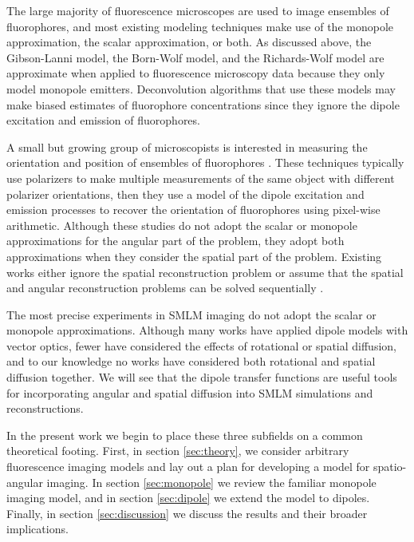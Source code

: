 \documentclass[]{osa-article}
\begin{document}
The large majority of fluorescence microscopes are used to image ensembles of
fluorophores, and most existing modeling techniques make use of the monopole
approximation, the scalar approximation, or both. As discussed above, the
Gibson-Lanni model, the Born-Wolf model, and the Richards-Wolf model are
approximate when applied to fluorescence microscopy data because they only model
monopole emitters. Deconvolution algorithms that use these models may make
biased estimates of fluorophore concentrations since they ignore the dipole
excitation and emission of fluorophores. 

A small but growing group of microscopists is interested in measuring the
orientation and position of ensembles of fluorophores \cite{vrabioiu2006,
  mattheyses2010, mehta2016, mcquilken2017, zhanghao2017}. These techniques
typically use polarizers to make multiple measurements of the same object with
different polarizer orientations, then they use a model of the dipole excitation
and emission processes \cite{fourkas2001} to recover the orientation of
fluorophores using pixel-wise arithmetic. Although these studies do not adopt
the scalar or monopole approximations for the angular part of the problem, they
adopt both approximations when they consider the spatial part of the problem.
Existing works either ignore the spatial reconstruction problem
\cite{vrabioiu2006, mattheyses2010, mehta2016, mcquilken2017} or assume that the
spatial and angular reconstruction problems can be solved sequentially
\cite{zhanghao2017}.

The most precise experiments in SMLM imaging do not adopt the scalar or monopole
approximations. Although many works have applied dipole models with vector
optics, fewer have considered the effects of rotational or spatial diffusion,
and to our knowledge no works have considered both rotational and spatial
diffusion together. We will see that the dipole transfer functions are useful
tools for incorporating angular and spatial diffusion into SMLM simulations and
reconstructions.

In the present work we begin to place these three subfields on a common
theoretical footing. First, in section \ref{sec:theory}, we consider arbitrary
fluorescence imaging models and lay out a plan for developing a model for
spatio-angular
imaging. %
In section \ref{sec:monopole} we review the familiar monopole imaging model, and
in section \ref{sec:dipole} we extend the model to
dipoles. %
Finally, in section \ref{sec:discussion} we discuss the results and their
broader implications.
\end{document}
